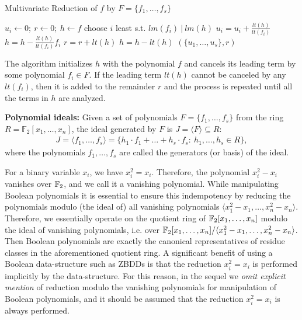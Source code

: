 \begin{algorithm}[H]
 \caption{Multivariate Reduction of $f$ by $F=\{f_1,\dots,f_s\}$}
 \label{algo:mv_reduce}
 \begin{algorithmic}[1]
 \State $u_i \gets 0; ~r \gets 0; ~h \gets f $ 
 \State choose $i$ least s.t. $lm(f_i) ~|~ lm(h)$
 \State $u_i = u_i + \frac{lt(h)}{lt(f_i)}$
 \State $h = h - \frac{lt(h)}{lt(f_i)} f_i$
 \Else
 \State $r = r+ lt(h)$
 \State $h = h - lt(h)$
 \EndIf
 \EndWhile
 \State \Return $(\{u_1,\dots,u_s\} , r)$
 \EndProcedure
 \end{algorithmic}
 \end{algorithm}

The algorithm initializes $h$ with the polynomial $f$ and cancels its
leading term by some  polynomial $f_i \in F$. If the leading term
$lt(h)$ cannot be canceled by any $lt(f_i)$, then it is added to the  
remainder $r$ and the process is repeated until all the terms in $h$ are analyzed. 

{\bf Polynomial ideals:} Given a set of polynomials $F = \{f_1, \dots,
f_s\}$ from the ring $R = \mathbb{F}_2[x_1,\dots, x_n]$, the ideal 
generated by $F$ is $J = \langle F\rangle \subseteq R$:
\begin{align}
J = \langle f_1, \dots, f_s \rangle =
\{h_1\cdot f_1+\dots+h_s\cdot f_s: ~h_1,\dots,h_s \in R\},
\end{align}
where the polynomials $f_1,\dots,f_s$ are called the generators (or
basis) of the ideal. 


For a binary variable $x_i$, we have $x_i^2 = x_i$. Therefore, the
polynomial $x_i^2 - x_i$ vanishes over ${\mathbb{F}}_{2}$, and we call it a
vanishing polynomial. While manipulating Boolean polynomials it is
essential to ensure this indempotency by reducing the polynomials
modulo (the ideal of) all vanishing polynomials $\langle
x_1^2-x_1,\dots,x_n^2-x_n\rangle$. Therefore, %
we essentially operate on the quotient ring of ${\mathbb{F}}_{2}[x_1,\dots,x_n]$
modulo the ideal of vanishing polynomials, i.e. %
over ${\mathbb{F}}_{2}[x_1,\dots,x_n]/\langle x_1^2-x_1,\dots,x_n^2-x_n\rangle$. 
Then Boolean polynomials are exactly the canonical representatives of
residue classes in the aforementioned quotient ring. A significant
benefit of using a Boolean data-structure such as ZBDDs is that the
reduction $x_i^2 = x_i$ is performed implicitly by the
data-structure. 
For this reason, in the sequel we {\it omit explicit mention} of
reduction modulo the vanishing polynomials for manipulation of Boolean
polynomials, and it should be assumed that the reduction $x_i^2 = x_i$
is always performed. 

